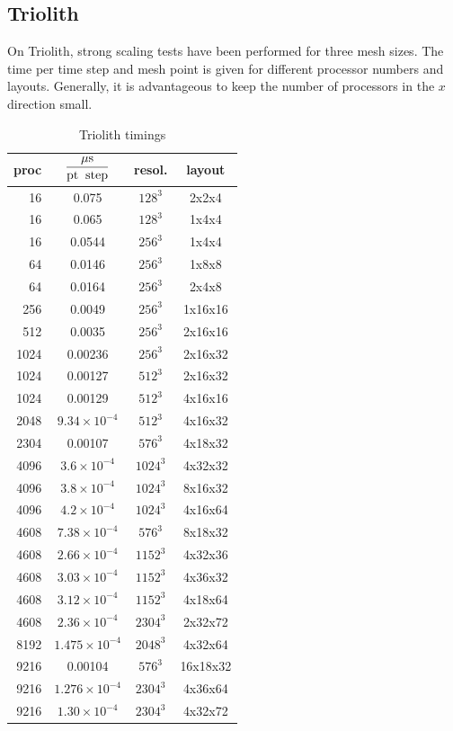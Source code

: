 \documentclass[\mydriver,12pt,twoside,notitlepage,a4paper]{article}
\begin{document}
\subsection{Triolith}

On Triolith, strong scaling tests have been performed
for three mesh sizes.
The time per time step and mesh point is given for
different processor numbers and layouts.
Generally, it is advantageous to keep the number
of processors in the $x$ direction small.

\begin{table}[htb]
  \begin{center}
    \caption{Triolith timings}
    \label{Tsummary-Triolith}
    \begin{tabular}{rccc}
    \toprule
proc & $\displaystyle\frac{{\mu\rm s}}{\rm pt\;\;step}$ & resol. & layout \\
    \midrule
  16 &0.075& $128^3$ & 2x2x4  \\
  16 &0.065& $128^3$ & 1x4x4  \\
  16 &0.0544& $256^3$ & 1x4x4  \\  %
  64 &0.0146& $256^3$ & 1x8x8  \\  %
  64 &0.0164& $256^3$ & 2x4x8  \\
 256 &0.0049& $256^3$ & 1x16x16 \\ %
 512 &0.0035& $256^3$ & 2x16x16 \\ %
1024 &0.00236 &$256^3$ & 2x16x32 \\ %
1024 &0.00127 &$512^3$ & 2x16x32 \\ %
1024 &0.00129 &$512^3$ & 4x16x16 \\
2048 & $9.34{\times}10^{-4}$ &$ 512^3$&4x16x32 \\ %
2304 & 0.00107 &$ 576^3$&4x18x32 \\  %
4096 &$3.6{\times}10^{-4}$&$1024^3$&4x32x32 \\
4096 &$3.8{\times}10^{-4}$&$1024^3$&8x16x32 \\
4096 &$4.2{\times}10^{-4}$&$1024^3$&4x16x64 \\
4608 &$7.38{\times}10^{-4}$&$ 576^3$&8x18x32 \\ %
4608 &$2.66{\times}10^{-4}$&$1152^3$&4x32x36 \\ %
4608 &$3.03{\times}10^{-4}$&$1152^3$&4x36x32 \\ %
4608 &$3.12{\times}10^{-4}$&$1152^3$&4x18x64 \\ %
4608 &$2.36{\times}10^{-4}$&$2304^3$&2x32x72 \\ %
8192 &$1.475{\times}10^{-4}$&$2048^3$&4x32x64 \\ %
9216 & 0.00104 &$ 576^3$&16x18x32 \\ %
9216 &$1.276{\times}10^{-4}$&$2304^3$&4x36x64 \\ %
9216 &$1.30{\times}10^{-4}$&$2304^3$&4x32x72 \\ %
    \bottomrule
    \end{tabular}
  \end{center}
\end{table}
\end{document}
